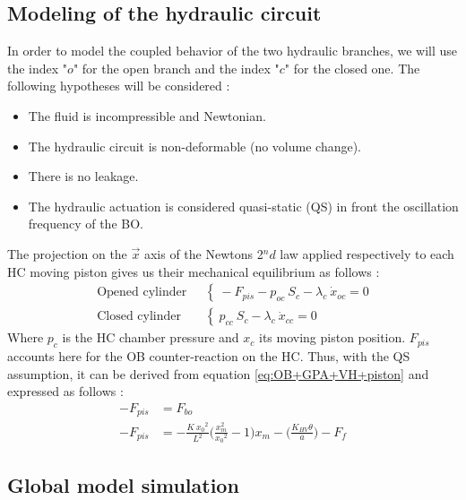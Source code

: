 \documentclass[3p,twocolumn,preprint]{elsarticle}
\begin{document}
	\subsection{Modeling of the hydraulic circuit}	
	\label{subsec:The hydraulic circuit}
In order to model the coupled behavior of the two hydraulic branches, we will use the index "$o$" for the open branch and the index "$c$" for the closed one. The following hypotheses will be considered :
\begin{itemize}
	\item The fluid is incompressible and Newtonian.
	\item The hydraulic circuit is non-deformable (no volume change).
	\item There is no leakage.
	\item The hydraulic actuation is considered quasi-static (QS) in front
	the oscillation frequency of the BO.
\end{itemize}
The projection on the $\vec{x}$ axis of the Newtons 2$^nd$ law applied respectively to each HC moving piston gives us their mechanical equilibrium as follows :
\begin{align}
	\text{Opened cylinder ~}& \left\{~
	-F_{pis} - p_{oc}\ S_{c} - \lambda_{c}\ \dot{x}_{oc} = 0
	\right.
	\label{eq:equilibre_dynamique_piston_ouvert}\\
	\text{Closed cylinder ~}& \left\{~
	p_{cc}\ S_{c} - \lambda_{c}\ \dot{x}_{cc} = 0
	\right.
	\label{eq:equilibre_dynamique_piston_ferme}
\end{align}
Where $p_c$ is the HC chamber pressure and $x_c$ its moving piston position. $F_{pis}$ accounts here for the OB counter-reaction on the HC. Thus, with the QS assumption, it can be derived from equation \ref{eq:OB+GPA+VH+piston}	and expressed as follows : 
\begin{align}
	-F_{pis} & = F_{bo}\\
	-F_{pis} & = -\frac{K\ {x_0}^2}{L^2}\biggl(\frac{x_m^2}{{x_0}^2} -1\biggr)x_m - \biggl( \frac{K_{HV}\theta}{a} \biggr) - F_f
	\label{eq:F_OB_xxxxxx}
\end{align}

	\subsection{Global model simulation}	
	\label{subsec:Global model simulation}
\end{document}
